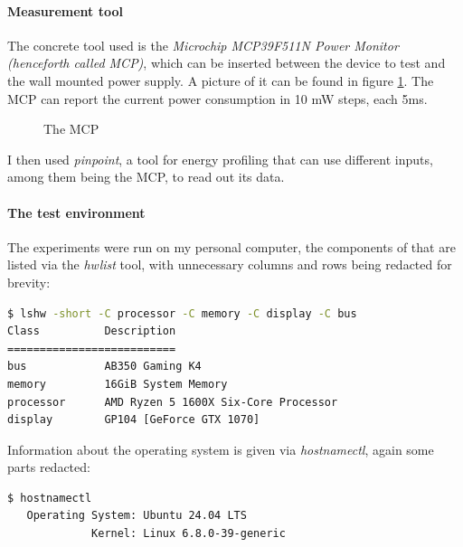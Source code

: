 \paragraph{Measurement tool}

The concrete tool used is the \emph{Microchip MCP39F511N Power Monitor (henceforth called MCP)}, which can be inserted between the device to test and the wall mounted power supply. A picture of it can be found in figure \ref{fig:mcp}. The MCP can report the current power consumption in 10 mW steps, each 5ms.

\begin{figure}
    \caption[short]{The MCP}
    \label{fig:mcp}
\end{figure}


I then used \emph{pinpoint}, a tool for energy profiling that can use different inputs, among them being the MCP, to read out its data. 

\paragraph{The test environment}

The experiments were run on my personal computer, the components of that are listed via the \emph{hwlist} tool, with unnecessary columns and rows being redacted for brevity:

\begin{lstlisting}[language=bash, frame=single, numbers=none, caption={Hardware environment of the measurements}, basicstyle=\ttfamily]
   $ lshw -short -C processor -C memory -C display -C bus
Class          Description
==========================
bus            AB350 Gaming K4
memory         16GiB System Memory
processor      AMD Ryzen 5 1600X Six-Core Processor
display        GP104 [GeForce GTX 1070]
\end{lstlisting}

Information about the operating system is given via \emph{hostnamectl}, again some parts redacted:

\begin{lstlisting}[language=bash, frame=single, numbers=none, caption={Used operating system information}, basicstyle=\ttfamily]
    $ hostnamectl 
   Operating System: Ubuntu 24.04 LTS                
             Kernel: Linux 6.8.0-39-generic
\end{lstlisting}

